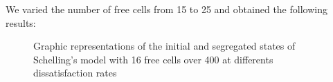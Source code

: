\documentclass[a4paper, 12pt]{report}
\begin{document}
We varied the number of free cells from 15 to 25 and obtained the following results:

\begin{figure}[!h]
	\centering
	\caption{Graphic representations of the initial and segregated states of Schelling's model with 16 free cells over 400 at differents dissatisfaction rates}
\end{figure}
\end{document}
